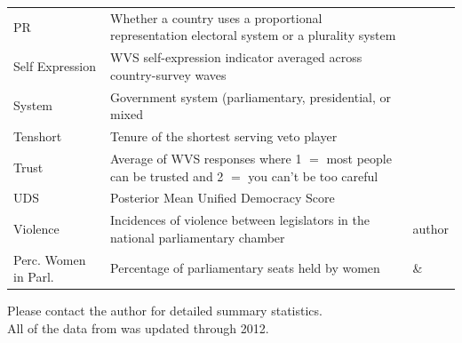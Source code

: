 \documentclass[a4paper]{article}\usepackage[]{graphicx}\usepackage[]{color}
\begin{document}
\begin{table}[!h]
\begin{center}
\begin{tabular}{l m{7cm} m{3.5cm}}
            PR & Whether a country uses a proportional representation electoral system or a plurality system & \cite{DPI2001} \\
            Self Expression & WVS self-expression indicator averaged across country-survey waves & \cite{WVS2009} \\
            System & Government system (parliamentary, presidential, or mixed & \cite{DPI2001} \\
            Tenshort & Tenure of the shortest serving veto player & \cite{DPI2001} \\
            Trust & Average of WVS responses where 1 $=$ most people can be trusted and 2 $=$ you can't be too careful & \cite{WVS2009} \\
            UDS & Posterior Mean Unified Democracy Score & \cite{Pemstein2010} \\
            Violence & Incidences of violence between legislators in the national parliamentary chamber & author \\
            Perc. Women in Parl. & Percentage of parliamentary seats held by women & \cite{WomParCrossNat} \& \cite{IPU2013} \\
            \hline

    \end{tabular}
    \end{center}
    \begin{singlespace}
        Please contact the author for detailed summary statistics. \\
        All of the data from \cite{DPI2001} was updated through 2012.
    \end{singlespace}
\end{table}
\end{document}
